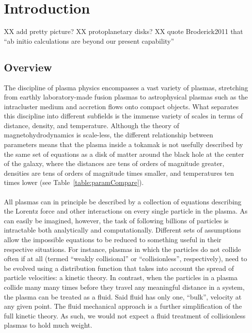 \chapter{Introduction}\label{chap:introduction}
XX add pretty picture?
XX protoplanetary disks?
XX quote Broderick2011 that ``ab initio calculations are beyond our present capability''

\section{Overview}
The discipline of plasma physics encompasses a vast variety of plasmas, stretching from earthly laboratory-made fusion plasmas to astrophysical plasmas such as the intracluster medium and accretion flows onto compact objects. What separates this discipline into different subfields is the immense variety of scales in terms of distance, density, and temperature. Although the theory of magnetohydrodynamics is scale-less, the different relationship between parameters means that the plasma inside a tokamak is not usefully described by the same set of equations as a disk of matter around the black hole at the center of the galaxy, where the distances are tens of orders of magnitude greater, densities are tens of orders of magnitude times smaller, and temperatures ten times lower (see Table~\ref{table:paramCompare}).\\
\\
All plasmas can in principle be described by a collection of equations describing the Lorentz force and other interactions on every single particle in the plasma. As can easily be imagined, however, the task of following billions of particles is intractable both analytically and computationally. Different sets of assumptions allow the impossible equations to be reduced to something useful in their respective situations. For instance, plasmas in which the particles do not collide often if at all (termed ``weakly collisional'' or ``collisionless'', respectively), need to be evolved using a distribution function that takes into account the spread of particle velocities: a kinetic theory. In contrast, when the particles in a plasma collide many many times before they travel any meaningful distance in a system, the plasma can be treated as a fluid. Said fluid has only one, ``bulk'', velocity at any given point. The fluid mechanical approach is a further simplification of the full kinetic theory. As such, we would not expect a fluid treatment of collisionless plasmas to hold much weight.\\
